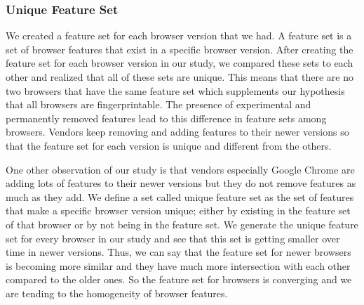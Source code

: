 \subsubsection{Unique Feature Set}
We created a feature set for each browser version that we had.
A feature set is a set of browser features that exist in a specific browser version.
After creating the feature set for each browser version in our study, we compared these sets to each other and realized that all of these sets are unique.
This means that there are no two browsers that have the same feature set which supplements our hypothesis that all browsers are fingerprintable. The presence of experimental and permanently removed features lead to this difference in feature sets among browsers. Vendors keep removing and adding features to their newer versions so that the feature set for each version is unique and different from the others.

One other observation of our study is that vendors especially Google Chrome are adding lots of features to their newer versions but they do not remove features as much as they add. We define a set called unique feature set as the set of features that make a specific browser version unique; either by existing in the feature set of that browser or by not being in the feature set. We generate the unique feature set for every browser in our study and see that this set is getting smaller over time in newer versions. Thus, we can say that the feature set for newer browsers is becoming more similar and they have much more intersection with each other compared to the older ones. So the feature set for browsers is converging and we are tending to the homogeneity of browser features. 

